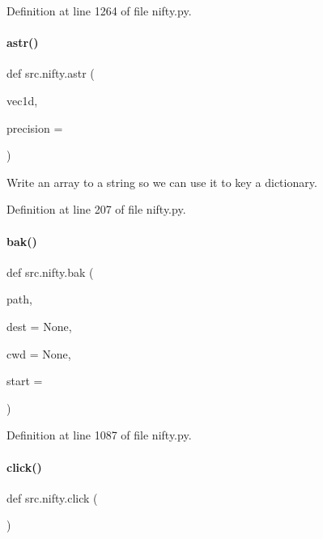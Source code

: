 Definition at line 1264 of file nifty.\+py.

\mbox{\label{namespacesrc_1_1nifty_ae6848e812afbae8005b70ed48087a1f2}} 
\paragraph{\texorpdfstring{astr()}{astr()}}
{\footnotesize\ttfamily def src.\+nifty.\+astr (\begin{DoxyParamCaption}\item[{}]{vec1d,  }\item[{}]{precision = {} }\end{DoxyParamCaption})}



Write an array to a string so we can use it to key a dictionary. 



Definition at line 207 of file nifty.\+py.

\mbox{\label{namespacesrc_1_1nifty_a4b61f227cf823453229a7c1b98c24e5d}} 
\paragraph{\texorpdfstring{bak()}{bak()}}
{\footnotesize\ttfamily def src.\+nifty.\+bak (\begin{DoxyParamCaption}\item[{}]{path,  }\item[{}]{dest = {\ttfamily None},  }\item[{}]{cwd = {\ttfamily None},  }\item[{}]{start = {} }\end{DoxyParamCaption})}



Definition at line 1087 of file nifty.\+py.

\mbox{\label{namespacesrc_1_1nifty_a2e2c25836c0f02766509a55a38b21c09}} 
\paragraph{\texorpdfstring{click()}{click()}}
{\footnotesize\ttfamily def src.\+nifty.\+click (\begin{DoxyParamCaption}{ }\end{DoxyParamCaption})}



